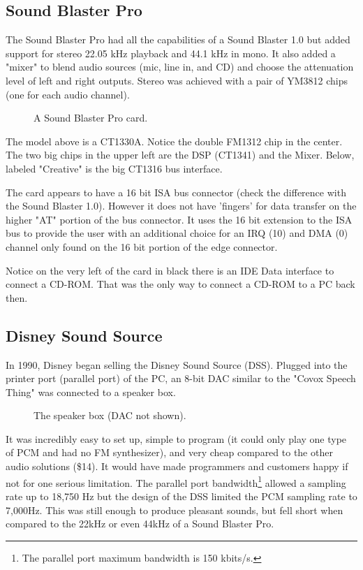 \documentclass[book.tex]{subfiles}
\begin{document}
  \subsection{Sound Blaster Pro}
The Sound Blaster Pro had all the capabilities of a Sound Blaster 1.0 but added support for stereo 22.05 kHz playback and 44.1 kHz in mono. It also added a "mixer" to blend audio sources (mic, line in, and CD) and choose the attenuation level of left and right outputs. Stereo was achieved with a pair of YM3812 chips (one for each audio channel).\\\label{sbmixerpage}
\begin{figure}[H] 
  \centering 
  \caption{A Sound Blaster Pro card.}
\end{figure}
The model above is a CT1330A. Notice the double FM1312 chip in the center. The two big chips in the upper left are the DSP (CT1341) and the Mixer. Below, labeled "Creative" is the big CT1316 bus interface.\\
\par
{} The card appears to have a 16 bit ISA bus connector (check the difference with the Sound Blaster 1.0). However it does not have 'fingers' for data transfer on the higher "AT" portion of the bus connector. It uses the 16 bit extension to the ISA bus to provide the user with an additional choice for an IRQ (10) and DMA (0) channel only found on the 16 bit portion of the edge connector.\\
\par
{} Notice on the very left of the card in black there is an IDE Data interface to connect a CD-ROM. That was the only way to connect a CD-ROM to a PC back then.


  \subsection{Disney Sound Source}
  In 1990, Disney began selling the Disney Sound Source (DSS). Plugged into the printer port (parallel port) of the PC, an 8-bit DAC similar to the "Covox Speech Thing" was connected to a speaker box. 
  \par
  \begin{figure}[H] 
    \centering 
    \caption{The speaker box (DAC not shown).}
  \end{figure}
\par
It was incredibly easy to set up, simple to program (it could only play one type of PCM and had no FM synthesizer), and very cheap compared to the other audio solutions (\$14). It would have made programmers and customers happy if not for one serious limitation. The parallel port bandwidth\footnote{The parallel port maximum bandwidth is 150 kbits/s.} allowed a sampling rate up to 18,750 Hz but the design of the DSS limited the PCM sampling rate to 7,000Hz. This was still enough to produce pleasant sounds, but fell short when compared to the 22kHz or even 44kHz of a Sound Blaster Pro.
\end{document}
